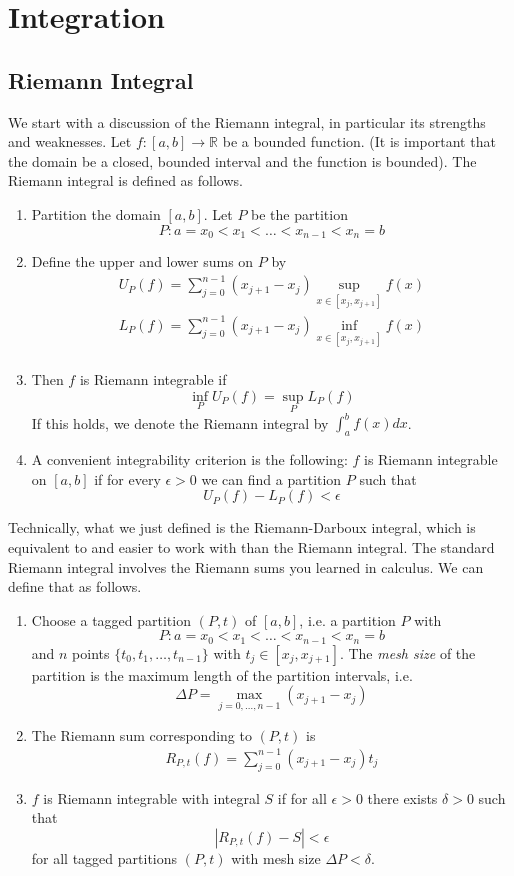 \documentclass[10pt]{article}         %
\theoremstyle{remark}
\newcommand{\R}{\mathbb{R}}
\begin{document}
\section{Integration}

\subsection{Riemann Integral}

We start with a discussion of the Riemann integral, in particular its strengths and weaknesses. Let $f: [a, b] \rightarrow \R$ be a bounded function. (It is important that the domain be a closed, bounded interval and the function is bounded). The Riemann integral is defined as follows.
\begin{enumerate}
    \item Partition the domain $[a,b]$. Let $P$ be the partition
    \[
    P: a = x_0 < x_1 < \dots < x_{n-1} < x_n = b
    \]
    \item Define the upper and lower sums on $P$ by
    \begin{align*}
        U_P(f) = \sum_{j = 0}^{n-1} (x_{j+1} - x_j) \sup_{x \in [x_j, x_{j+1}]} f(x) \\
        L_P(f) = \sum_{j = 0}^{n-1} (x_{j+1} - x_j) \inf_{x \in [x_j, x_{j+1}]} f(x) \\
    \end{align*}
    \item Then $f$ is Riemann integrable if
    \[
    \inf_P U_P(f) = \sup_P L_P(f)
    \]
    If this holds, we denote the Riemann integral by $\int_a^b f(x) dx$.
    \item A convenient integrability criterion is the following: $f$ is Riemann integrable on $[a, b]$ if for every $\epsilon > 0$ we can find a partition $P$ such that
    \[
    U_P(f) - L_P(f) < \epsilon
    \]
\end{enumerate}
Technically, what we just defined is the Riemann-Darboux integral, which is equivalent to and easier to work with than the Riemann integral. The standard Riemann integral involves the Riemann sums you learned in calculus. We can define that as follows.
\begin{enumerate}
    \item Choose a tagged partition $(P, t)$ of $[a, b]$, i.e. a partition $P$ with
    \[
    P: a = x_0 < x_1 < \dots < x_{n-1} < x_n = b
    \]
    and $n$ points $\{ t_0, t_1, \dots, t_{n-1} \}$ with $t_j \in [x_j, x_{j+1}]$. The \emph{mesh size} of the partition is the maximum length of the partition intervals, i.e.
    \[
    \Delta P = \max_{j = 0, \dots, n-1}(x_{j+1} - x_j)
    \]
    \item The Riemann sum corresponding to $(P, t)$ is    
    \begin{align*}
        R_{P,t}(f) = \sum_{j = 0}^{n-1} (x_{j+1} - x_j) t_j
    \end{align*}
    \item $f$ is Riemann integrable with integral $S$ if for all $\epsilon > 0$ there exists $\delta > 0$ such that
    \[
    |R_{P, t}(f) - S| < \epsilon
    \]
    for all tagged partitions $(P, t)$ with mesh size $\Delta P < \delta$. 
\end{enumerate}
\end{document}
